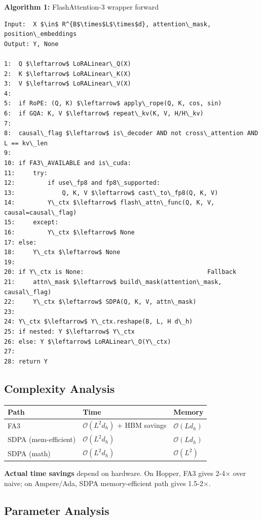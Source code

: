 \textbf{Algorithm 1:} FlashAttention-3 wrapper forward
\begin{lstlisting}
Input:  X $\in$ R^{B$\times$L$\times$d}, attention\_mask, position\_embeddings
Output: Y, None

1:  Q $\leftarrow$ LoRALinear\_Q(X)
2:  K $\leftarrow$ LoRALinear\_K(X)
3:  V $\leftarrow$ LoRALinear\_V(X)
4:
5:  if RoPE: (Q, K) $\leftarrow$ apply\_rope(Q, K, cos, sin)
6:  if GQA: K, V $\leftarrow$ repeat\_kv(K, V, H/H\_kv)
7:
8:  causal\_flag $\leftarrow$ is\_decoder AND not cross\_attention AND L == kv\_len
9:
10: if FA3\_AVAILABLE and is\_cuda:
11:     try:
12:         if use\_fp8 and fp8\_supported:
13:             Q, K, V $\leftarrow$ cast\_to\_fp8(Q, K, V)
14:         Y\_ctx $\leftarrow$ flash\_attn\_func(Q, K, V, causal=causal\_flag)
15:     except:
16:         Y\_ctx $\leftarrow$ None
17: else:
18:     Y\_ctx $\leftarrow$ None
19:
20: if Y\_ctx is None:                                  Fallback
21:     attn\_mask $\leftarrow$ build\_mask(attention\_mask, causal\_flag)
22:     Y\_ctx $\leftarrow$ SDPA(Q, K, V, attn\_mask)
23:
24: Y\_ctx $\leftarrow$ Y\_ctx.reshape(B, L, H d\_h)
25: if nested: Y $\leftarrow$ Y\_ctx
26: else: Y $\leftarrow$ LoRALinear\_O(Y\_ctx)
27:
28: return Y
\end{lstlisting}

\subsection{Complexity Analysis}

\begin{table}[H]
\centering
\small
\begin{tabular}{lll}
\toprule
\textbf{Path} & \textbf{Time} & \textbf{Memory} \\
\midrule
FA3 & $\mathcal{O}(L^2 d_h)$ + HBM savings & $\mathcal{O}(L d_h)$ \\
SDPA (mem-efficient) & $\mathcal{O}(L^2 d_h)$ & $\mathcal{O}(L d_h)$ \\
SDPA (math) & $\mathcal{O}(L^2 d_h)$ & $\mathcal{O}(L^2)$ \\
\bottomrule
\end{tabular}
\end{table}

\textbf{Actual time savings} depend on hardware. On Hopper, FA3 gives 2-4$\times$ over 
naive; on Ampere/Ada, SDPA memory-efficient path gives 1.5-2$\times$.

\subsection{Parameter Analysis}

